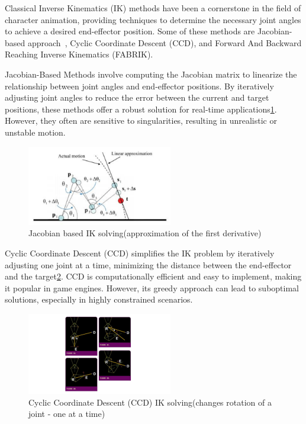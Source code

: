 \documentclass[../../main.tex]{subfiles}
\begin{document}
Classical Inverse Kinematics (IK) methods have been a cornerstone in the field of character animation, providing techniques to determine the necessary joint angles to achieve a desired end-effector position. Some of these methods are Jacobian-based approach~\cite{4648032}, Cyclic Coordinate Descent (CCD)\cite{kenwright2012inverse}, and Forward And Backward Reaching Inverse Kinematics (FABRIK)\cite{aristidou2011fabrik}.

Jacobian-Based Methods involve computing the Jacobian matrix to linearize the relationship between joint angles and end-effector positions. By iteratively adjusting joint angles to reduce the error between the current and target positions, these methods offer a robust solution for real-time applications\ref{fig:jacobian_based}. However, they often are sensitive to singularities, resulting in unrealistic or unstable motion.

\begin{figure}
    \centering \includegraphics[width = 2.5in]{chapters/motion_matching/images/jacobian_based.png}
    \caption{Jacobian based IK solving(approximation of the first derivative)}
    \label{fig:jacobian_based}
\end{figure}

Cyclic Coordinate Descent (CCD) simplifies the IK problem by iteratively adjusting one joint at a time, minimizing the distance between the end-effector and the target\ref{fig:ccdik}. CCD is computationally efficient and easy to implement, making it popular in game engines. However, its greedy approach can lead to suboptimal solutions, especially in highly constrained scenarios.

\begin{figure}
  \centering \includegraphics[width = 2.5in]{chapters/motion_matching/images/ccdik.png}
  \caption{Cyclic Coordinate Descent (CCD) IK solving(changes rotation of a joint - one at a time)}
  \label{fig:ccdik}
\end{figure}
\end{document}
